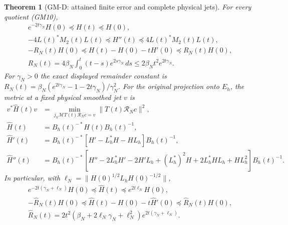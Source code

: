 \documentclass[11pt]{article}
\newtheorem{theorem}{Theorem}
\theoremstyle{remark}\newtheorem{remark}[theorem]{Remark}
\begin{document}
\begin{theorem}[GM-D: attained finite error and complete physical jets]
For every quotient (GM10),
\begin{equation}\tag{GM13}
 \begin{gathered}
 e^{-2t\gamma_N}H(0)\preceq H(t)\preceq H(0),\\
 -4L(t)^*M_2(t)L(t)\preceq H''(t)
                     \preceq4L(t)^*M_2(t)L(t),\\
 -R_N(t)H(0)\preceq H(t)-H(0)-tH'(0)\preceq R_N(t)H(0),\\
 R_N(t)=4\beta_N\int_0^t(t-s)e^{2s\gamma_N}\,ds
 \leq2\beta_Nt^2e^{2t\gamma_N}.
 \end{gathered}
\end{equation}
For $\gamma_N>0$ the exact displayed remainder constant is
$R_N(t)=\beta_N(e^{2t\gamma_N}-1-2t\gamma_N)/\gamma_N^2$.
For the original projection onto $E_h$, the metric at a fixed
\emph{physical} smoothed jet $v$ is
\begin{equation}\tag{GM14}
 \begin{split}
 v^*\widehat H(t)v
 &=\min_{j_h\mathcal M T(t)\mathcal R_Nc=v}
                  \|T(t)\mathcal R_Nc\|^2,\\
 \widehat H(t)&=B_h(t)^{-*}H(t)B_h(t)^{-1},\\
 \widehat H'(t)&=B_h(t)^{-*}
       [H'-L_h^*H-HL_h]B_h(t)^{-1},\\
 \widehat H''(t)&=B_h(t)^{-*}
       [H''-2L_h^*H'-2H'L_h+(L_h^*)^2H
                    +2L_h^*HL_h+HL_h^2]B_h(t)^{-1}.
 \end{split}
\end{equation}
In particular, with $\ell_N=\|H(0)^{1/2}L_hH(0)^{-1/2}\|$,
\begin{equation}\tag{GM15}
 \begin{gathered}
 e^{-2t(\gamma_N+\ell_N)}H(0)
       \preceq\widehat H(t)\preceq e^{2t\ell_N}H(0),\\
 -\widehat R_N(t)H(0)
 \preceq\widehat H(t)-H(0)-t\widehat H'(0)
 \preceq\widehat R_N(t)H(0),\\
 \widehat R_N(t)=2t^2
       (\beta_N+2\ell_N\gamma_N+\ell_N^2)
                     e^{2t(\gamma_N+\ell_N)}.
 \end{gathered}
\end{equation}
\end{theorem}
\end{document}
